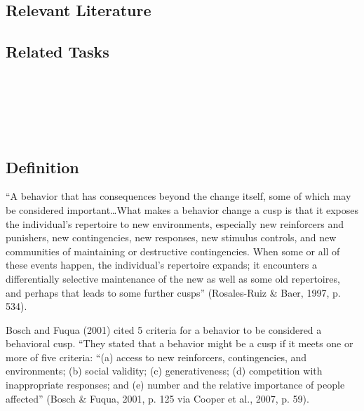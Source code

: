 \subsection{Relevant Literature}
\begin{refsection}
\nocite{test,alang2017police,clayton2018black}
\printbibliography[heading=none]
\end{refsection}
%
\subsection{Related Tasks}
\fourjSix{}\\
\fourjSeven{}\\
\fourjEight{}\\
\fourjEleven{}\\
%
%
%
%
%
%
%
%
%
%
\section[\fourjThirteen{}]{\fourjThirteen{}%
              }
\subsection{Definition}
``A behavior that has consequences beyond the change itself, some of which may be considered important…What makes a behavior change a cusp is that it exposes the individual's repertoire to new environments, especially new reinforcers and punishers, new contingencies, new responses, new stimulus controls, and new communities of maintaining or destructive contingencies. When some or all of these events happen, the individual's repertoire expands; it encounters a differentially selective maintenance of the new as well as some old repertoires, and perhaps that leads to some further cusps'' (Rosales-Ruiz \& Baer, 1997, p. 534).

Bosch and Fuqua (2001) cited 5 criteria for a behavior to be considered a behavioral cusp. ``They stated that a behavior might be a cusp if it meets one or more of five criteria: ``(a) access to new reinforcers, contingencies, and environments; (b) social validity; (c) generativeness; (d) competition with inappropriate responses; and (e) number and the relative importance of people affected'' (Bosch \& Fuqua, 2001, p. 125 via Cooper et al., 2007, p. 59).
%
